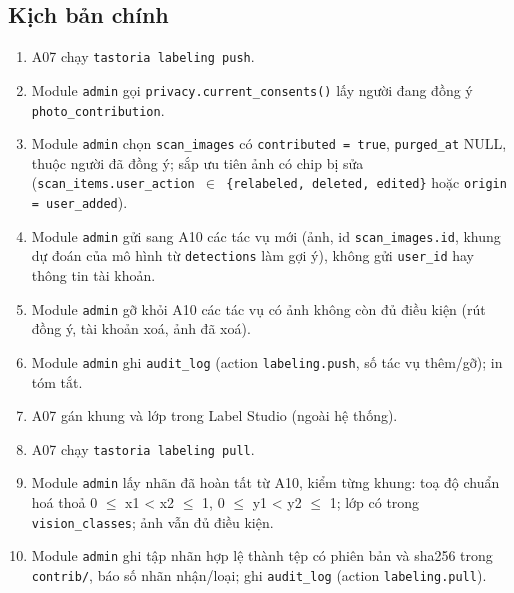 \subsection{Kịch bản chính}
\begin{enumerate}
\item A07 chạy {\small\texttt{tastoria labeling push}}.
\item Module {\small\texttt{admin}} gọi {\small\texttt{privacy.\allowbreak{}current\_\allowbreak{}\allowbreak{}consents()}} lấy người đang đồng ý {\small\texttt{photo\_\allowbreak{}\allowbreak{}contribution}}.
\item Module {\small\texttt{admin}} chọn {\small\texttt{scan\_\allowbreak{}\allowbreak{}images}} có {\small\texttt{contributed = true}}, {\small\texttt{purged\_\allowbreak{}\allowbreak{}at}} NULL, thuộc người đã đồng ý; sắp ưu tiên ảnh có chip bị sửa ({\small\texttt{scan\_\allowbreak{}\allowbreak{}items.\allowbreak{}user\_\allowbreak{}\allowbreak{}action \ensuremath{\in} \{relabeled, deleted, edited\}}} hoặc {\small\texttt{origin = user\_\allowbreak{}\allowbreak{}added}}).
\item Module {\small\texttt{admin}} gửi sang A10 các tác vụ mới (ảnh, id {\small\texttt{scan\_\allowbreak{}\allowbreak{}images.\allowbreak{}id}}, khung dự đoán của mô hình từ {\small\texttt{detections}} làm gợi ý), không gửi {\small\texttt{user\_\allowbreak{}\allowbreak{}id}} hay thông tin tài khoản.
\item Module {\small\texttt{admin}} gỡ khỏi A10 các tác vụ có ảnh không còn đủ điều kiện (rút đồng ý, tài khoản xoá, ảnh đã xoá).
\item Module {\small\texttt{admin}} ghi {\small\texttt{audit\_\allowbreak{}\allowbreak{}log}} (action {\small\texttt{labeling.\allowbreak{}push}}, số tác vụ thêm/\allowbreak{}gỡ); in tóm tắt.
\item A07 gán khung và lớp trong Label Studio (ngoài hệ thống).
\item A07 chạy {\small\texttt{tastoria labeling pull}}.
\item Module {\small\texttt{admin}} lấy nhãn đã hoàn tất từ A10, kiểm từng khung: toạ độ chuẩn hoá thoả 0 \ensuremath{\leq} x1 < x2 \ensuremath{\leq} 1, 0 \ensuremath{\leq} y1 < y2 \ensuremath{\leq} 1; lớp có trong {\small\texttt{vision\_\allowbreak{}\allowbreak{}classes}}; ảnh vẫn đủ điều kiện.
\item Module {\small\texttt{admin}} ghi tập nhãn hợp lệ thành tệp có phiên bản và sha256 trong {\small\texttt{contrib/\allowbreak{}\allowbreak{}}}, báo số nhãn nhận/\allowbreak{}loại; ghi {\small\texttt{audit\_\allowbreak{}\allowbreak{}log}} (action {\small\texttt{labeling.\allowbreak{}pull}}).
\end{enumerate}
